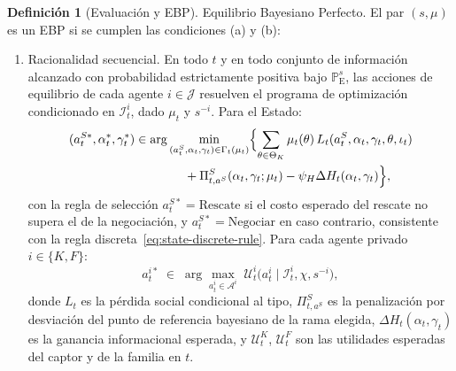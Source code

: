 \documentclass[review,authoryear,12pt]{elsarticle}
\theoremstyle{plain}
\theoremstyle{definition}
\newtheorem{definition}[theorem]{Definición}
\newcommand{\ProbE}{\mathbb{P}_{\mathrm{E}}}
\newcommand{\ThetaK}{\Theta_K}
\newcommand{\1}{\mathbf{1}}
\begin{document}
\begin{definition}[Evaluación y EBP]
\smallskip
\noindent Equilibrio Bayesiano Perfecto. El par $(s,\mu)$ es un EBP si se cumplen las condiciones \textup{(a)} y \textup{(b)}:
\begin{enumerate}
  \item[\textup{(a)}] Racionalidad secuencial. En todo $t$ y en todo conjunto de información alcanzado con probabilidad estrictamente positiva bajo $\ProbE^s$, las acciones de equilibrio de cada agente $i\in\mathcal{J}$ resuelven el programa de optimización condicionado en $\mathcal{I}_t^i$, dado $\mu_t$ y $s^{-i}$. Para el Estado:
  \[
  \begin{aligned}
  (a_t^{S\ast},\alpha_t^\ast,\gamma_t^\ast)
  &\in
  \arg\min_{(a_t^S,\alpha_t,\gamma_t)\in\Gamma_t(\mu_t)}
  \Bigl\{
  \sum_{\theta\in\ThetaK}\mu_t(\theta)\,L_t(a_t^S,\alpha_t,\gamma_t,\theta,\iota_t)\\
  &\qquad\qquad
  +\Pi_{t,a^S}^S(\alpha_t,\gamma_t;\mu_t)-\psi_H\Delta H_t(\alpha_t,\gamma_t)
  \Bigr\},
  \end{aligned}
  \]
  con la regla de selección $a_t^{S\ast}=\text{Rescate}$ si el costo esperado del rescate no supera el de la negociación, y $a_t^{S\ast}=\text{Negociar}$ en caso contrario, consistente con la regla discreta~\eqref{eq:state-discrete-rule}. Para cada agente privado $i\in\{K,F\}$:
  \[
  a_t^{i\ast}\;\in\;
  \arg\max_{a_t^i\in\mathcal{A}^i}
  \;\mathcal{U}^i_t\!\bigl(a_t^i\mid \mathcal{I}_t^i,\chi,s^{-i}\bigr),
  \]
  donde $L_t$ es la pérdida social condicional al tipo, $\Pi_{t,a^S}^S$ es la penalización por desviación del punto de referencia bayesiano de la rama elegida, $\Delta H_t(\alpha_t,\gamma_t)$ es la ganancia informacional esperada, y $\mathcal{U}^K_t$, $\mathcal{U}^F_t$ son las utilidades esperadas del captor y de la familia en $t$.


\end{enumerate}
\end{definition}
\end{document}
